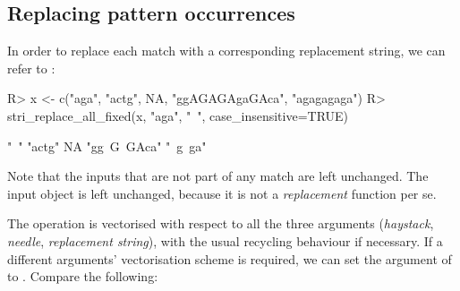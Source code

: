 \documentclass[nojss]{jss}
\begin{document}





\subsection{Replacing pattern occurrences}

In order to replace each match with a corresponding
replacement string, we can refer to :

\begin{Schunk}
\begin{Sinput}
R> x <- c("aga", "actg", NA, "ggAGAGAgaGAca", "agagagaga")
R> stri_replace_all_fixed(x, "aga", "~", case_insensitive=TRUE)
\end{Sinput}
\begin{Soutput}
[1] "~"         "actg"      NA          "gg~G~GAca" "~g~ga"
\end{Soutput}
\end{Schunk}

Note that the inputs that are not part of any match are left unchanged.
The input object is left unchanged, because it is not a \textit{replacement}
function per se.

The operation is vectorised with respect to all the three arguments
(\textit{haystack}, \textit{needle}, \textit{replacement string}),
with the usual recycling behaviour if necessary.
If a different arguments' vectorisation scheme is required,
we can set the  argument of 
to .
Compare the following:
\end{document}
